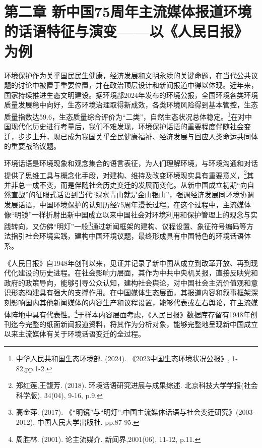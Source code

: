 \section{第二章
新中国75周年主流媒体报道环境的话语特征与演变------以《人民日报》为例}\label{ux7b2cux4e8cux7ae0-ux65b0ux4e2dux56fd75ux5468ux5e74ux4e3bux6d41ux5a92ux4f53ux62a5ux9053ux73afux5883ux7684ux8bddux8bedux7279ux5f81ux4e0eux6f14ux53d8ux4ee5ux4ebaux6c11ux65e5ux62a5ux4e3aux4f8b}

环境保护作为关乎国民民生健康，经济发展和文明永续的关键命题，在当代公共议题的讨论中被置于重要位置，并在政治顶层设计和新闻报道中得以体现。近年来，国家持续推进生态文明建设。据环境部2024年发布的环境公报，全国环境各类环境质量发展稳中向好，生态环境治理取得新成效，各类环境风险得到基本管控，生态质量指数达59.6，生态质量综合评价为``二类''，自然生态状况总体稳定。\footnote{中华人民共和国生态环境部.
  (2024). 《2023中国生态环境状况公报》, 1-82,pp.1-2.}在对中国现代化历史进行考量后，我们不难发现，环境保护话语的重要程度伴随社会变迁，步步上升，现已成为我国关乎全民健康福祉、经济发展与回应人类命运共同体的重要战略议题。

环境话语是环境现象和观念集合的语言表征，为人们理解环境，与环境沟通和对话提供了思维工具与概念化手段，对建构、维持及改变环境现实具有重要意义，\footnote{郑红莲,王馥芳.
  (2018). 环境话语研究进展与成果综述. 北京科技大学学报(社会科学版),
  34(04), 9-16, p.9.}其并非总一成不变，而是伴随社会历史变迁的发展而变化。从新中国成立初期``向自然宣战''的征服式话语到当代``绿水青山就是金山银山''，强调经济发展同环境协调发展话语，中国环境保护的认知历经75周年漫长过程。在这个过程中，主流媒体像``明镜''一样折射出新中国成立以来中国社会对环境利用和保护管理上的观念与实践转向，又仿佛``明灯''一般\footnote{高金萍.
  (2017).
  《``明镜''与``明灯'':中国主流媒体话语与社会变迁研究》(2003-2012).
  中国人民大学出版社, pp.87-95.}通过新闻框架的建构、议程设置、象征符号编码等方法指引社会环境实践，建构中国环境议题，最终形成具有中国特色的环境话语体系。

《人民日报》自1948年创刊以来，见证并记录了新中国从成立到改革开放、再到现代化建设的历史进程。在社会影响力层面，其作为中共中央机关报，直接反映党和政府的政策导向，能够引导公众认知，建构社会舆论，对中国社会主流价值观和意识形态构建具有强大的支撑作用。在中国媒体生态层面，其报道内容和叙事框架深刻影响国内其他新闻媒体的内容生产和议程设置，能够代表或左右舆论，在主流媒体阵地中具有代表性。\footnote{周胜林.
  (2001). 论主流媒介. 新闻界,2001(06), 11-12, p.11.}于样本内容层面考虑，《人民日报》数据库存留有1948年创刊迄今完整的纸面新闻报道资料，将其作为分析对象，能够完整地呈现新中国成立以来主流媒体有关于环境话语变迁的全过程。

